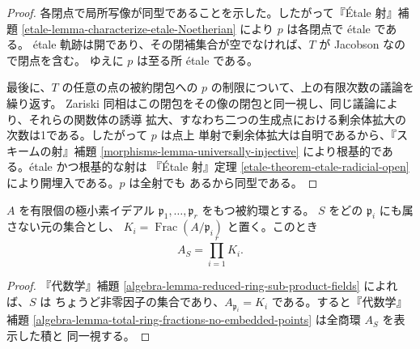 \begin{proof}
各閉点で局所写像が同型であることを示した。したがって『Étale 射』補題
\ref{etale-lemma-characterize-etale-Noetherian} により $p$ は各閉点で étale である。
étale 軌跡は開であり、その閉補集合が空でなければ、$T$ が Jacobson なので閉点を含む。
ゆえに $p$ は至る所 étale である。

最後に、$T$ の任意の点の被約閉包への $p$ の制限について、上の有限次数の議論を繰り返す。
Zariski 同相はこの閉包をその像の閉包と同一視し、同じ議論により、それらの関数体の誘導
拡大、すなわち二つの生成点における剰余体拡大の次数は1である。したがって $p$ は点上
単射で剰余体拡大は自明であるから、『スキームの射』補題
\ref{morphisms-lemma-universally-injective} により根基的である。étale かつ根基的な射は
『Étale 射』定理 \ref{etale-theorem-etale-radicial-open} により開埋入である。$p$ は全射でも
あるから同型である。
\end{proof}

\begin{lemma}
\label{lemma-total-fractions-reduced}
$A$ を有限個の極小素イデアル $\mathfrak p_1,\ldots,\mathfrak p_r$ をもつ被約環とする。
$S$ をどの $\mathfrak p_i$ にも属さない元の集合とし、
$K_i=\operatorname{Frac}(A/\mathfrak p_i)$ と置く。このとき
$$
A_S=\prod_{i=1}^rK_i.
$$
\end{lemma}

\begin{proof}
『代数学』補題 \ref{algebra-lemma-reduced-ring-sub-product-fields} によれば、$S$ は
ちょうど非零因子の集合であり、$A_{\mathfrak p_i}=K_i$ である。すると『代数学』補題
\ref{algebra-lemma-total-ring-fractions-no-embedded-points} は全商環 $A_S$ を表示した積と
同一視する。
\end{proof}



